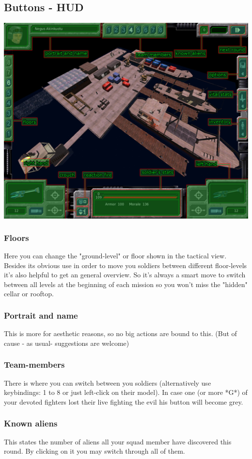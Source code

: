 \subsection{Buttons - HUD}
\includegraphics[width=\textwidth]{images/HUD_final.jpg}
\subsubsection{Floors}
Here you can change the "ground-level" or floor shown in the tactical view. Besides its obvious use in order to move you soldiers between different floor-levels it's also helpful to get an general overview. So it's always a smart move to switch between all levels at the beginning of each mission so you won't miss the "hidden" cellar or rooftop.
\subsubsection{Portrait and name}
This is more for aesthetic reasons, so no big actions are bound to this. (But of cause - as usual- suggestions are welcome)
\subsubsection{Team-members}
There is where you can switch between you soldiers (alternatively use keybindings: 1 to 8 or just left-click on their model). In case one (or more *G*) of your devoted fighters lost their live fighting the evil his button will become grey.
\subsubsection{Known aliens}
This states the number of aliens all your squad member have discovered this round. By clicking on it you may switch through all of them.
